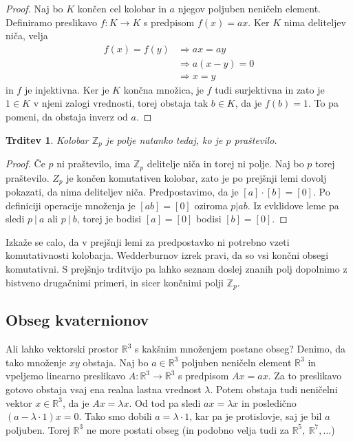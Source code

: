 \documentclass[10pt, a4paper]{article}
\newtheorem{trditev}[izr]{Trditev}
\newenvironment{noticeC}{%
  \tcolorbox[%
  notitle,
  empty,
  enhanced,  %
  breakable,
  coltext=black, 
  fontupper=\rmfamily,
  noparskip,
  sharp corners,
  boxrule=-1pt,  %
  frame hidden,
  left=7pt,  %
  right=7pt,
  top=5pt,
  bottom=5pt,
  before skip=2.5ex plus 2pt,
  after skip=2.5ex plus 2pt,
  overlay unbroken and last={%
  },
  ]}
{\endtcolorbox}
\newenvironment{dokaz}%
  {\begin{noticeC}\begin{proof}}%
  {\end{proof}\end{noticeC}}
\newcommand{\Z}{\mathbb {Z}}
\newcommand{\R}{\mathbb {R}}
\begin{document}
\begin{dokaz}
  Naj bo $K$ končen cel kolobar in $a$ njegov poljuben neničeln element.
  Definiramo preslikavo $f: K \to K$ s predpisom $f(x) = ax$.
  Ker $K$ nima deliteljev niča, velja 
  \begin{align*}
    f(x) = f(y) &\Rightarrow ax = ay\\
    &\Rightarrow a (x - y) = 0\\
    &\Rightarrow x = y
  \end{align*}
  in $f$ je injektivna. Ker je $K$ končna množica, je $f$ tudi surjektivna in zato je $1 \in K$
  v njeni zalogi vrednosti, torej obstaja tak $b \in K$, da je $f(b) = 1$.
  To pa pomeni, da obstaja inverz od $a$.
\end{dokaz}

\begin{trditev}
  Kolobar $\Z_p$ je polje natanko tedaj, ko je $p$ praštevilo.
\end{trditev}

\begin{dokaz}
  Če $p$ ni praštevilo, ima $\Z_p$ delitelje niča in torej ni polje.
  Naj bo $p$ torej praštevilo.
  $Z_p$ je končen komutativen kolobar, zato je po prejšnji lemi dovolj
  pokazati, da nima deliteljev niča.
  Predpostavimo, da je $[a] \cdot [b] = [0]$.
  Po definiciji operacije množenja je $[ab] = [0]$ oziroma $p | ab$.
  Iz evklidove leme pa sledi $p\ |\ a$ ali $p \ |\ b$, torej je bodisi $[a] = [0]$
  bodisi $[b] = [0].$
\end{dokaz}

Izkaže se calo, da v prejšnji lemi za predpostavko ni potrebno vzeti komutativnosti 
kolobarja.  Wedderburnov izrek pravi, da so vsi končni obsegi komutativni. S prejšnjo trditvijo pa lahko seznam doslej znanih polj dopolnimo z bistveno drugačnimi 
primeri, in sicer končnimi polji $\Z_p$.

\subsection{Obseg kvaternionov}

Ali lahko vektorski prostor $\R^3$ s kakšnim množenjem postane obseg?
Denimo, da tako množenje $xy$ obstaja.
Naj bo $a \in \R^3$ poljuben neničeln element $\R^3$ in vpeljemo linearno preslikavo $A: \R^3 \to \R^3$ 
s predpisom $Ax = ax$.
Za to preslikavo gotovo obstaja vsaj ena realna lastna vrednost $\lambda$.
Potem obstaja tudi neničelni vektor $x \in \R^3$, da je $Ax = \lambda x$.
Od tod pa sledi $ax = \lambda x$ in posledično $(a - \lambda \cdot 1) x = 0.$
Tako smo dobili $a = \lambda \cdot 1$, kar pa je protislovje, saj je bil $a$ poljuben.
Torej $\R^3$ ne more postati obseg (in podobno velja tudi za $\R^5,\ \R^7, \dots$)
\end{document}
